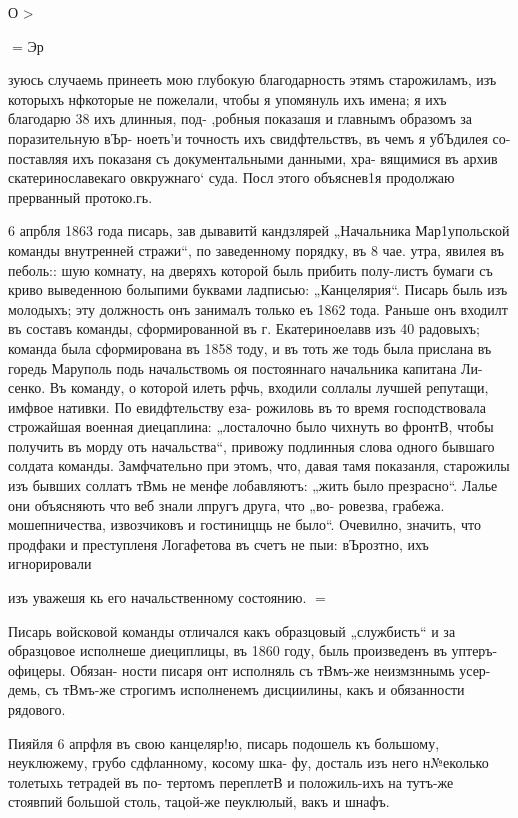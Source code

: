 {О >

= Эр

зуюсь случаемь принееть мою глубокую благодарность этямъ
старожиламъ, изъ которыхъ нфкоторые не пожелали, чтобы я
упомянуль ихъ имена; я ихъ благодарю 38 ихъ длинныя, под-
‚робныя показашя и главнымъ образомъ за поразительную вЪр-
ноеть’и точность ихъ свидфтельствъ, въ чемъ я убЪдилея со-
поставляя ихъ показаня съ документальными данными, хра-
вящимися въ архив скатеринославекаго овкружнаго‘ суда.
Посл этого объяснев1я продолжаю прерванный протоко.гь.

6 апрбля 1863 года писарь, зав дывавитй кандзлярей
„Начальника Мар1упольской команды внутренней стражи“,
по заведенному порядку, въ 8 чае. утра, явилея въ пеболь::
шую комнату, на дверяхъ которой быль прибить полу-листъ
бумаги съ криво выведенною болыпими буквами ладписью:
„Канцелярия“. Писарь быль изъ молодыхъ; эту должность
онъ занималъ только еъ 1862 тода. Раньше онъ входилт
въ составъ команды, сформированной въ г. Екатериноелавв
изъ 40 радовыхъ; команда была сформирована въ 1858 тоду,
и въ тоть же тодь была прислана въ горедь Маруполь
подь начальствомь оя постояннаго начальника капитана Ли-
сенко. Въ команду, о которой илеть рфчь, входили соллалы
лучшей репутащи, имфвое нативки. По евидфтельству еза-
рожиловь въ то время господствовала строжайшая военная
диецаплина: „лосталочно было чихнуть во фронтВ, чтобы
получить въ морду оть начальства“, привожу подлинныя
слова одного бывшаго солдата команды. Замфчательно при
этомъ, что, давая тамя показанля, старожилы изъ бывших
соллатъ тВмь не менфе лобавляютъ: „жить было презрасно“.
Лалье они объясняють что веб знали лпругъ друга, что „во-
ровезва, грабежа. мошепничества, извозчиковъ и гостиницщь
не было“. Очевилно, значить, что продфаки и преступленя
Логафетова въ счетъ не пыи: вЪрозтно, ихъ игнорировали

изъ уважешя кь его начальственному состоянию.
=

Писарь войсковой команды отличался какъ образцовый
„службисть“ и за образцовое исполнеше диециплицы, въ
1860 году, быль произведенъ въ уптеръ-офицеры. Обязан-
ности писаря онт исполняль съ тВмъ-же неизмзннымь усер-
демь, съ тВмъ-же строгимъ исполненемъ дисциилины, какъ
и обязанности рядового.

Пияйля 6 апрфля въ свою канцеляр!ю, писарь подошель
къ большому, неуклюжему, грубо сдфланному, косому шка-
фу, досталь изъ него н№еколько толетыхь тетрадей въ по-
тертомъ переплетВ и положиль-ихъ на тутъ-же стоявпий
большой столь, тацой-же пеуклюлый, вакъ и шнафъ.

}
